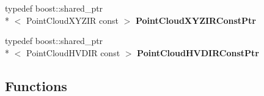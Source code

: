 \begin{DoxyCompactItemize}
\item 
\hypertarget{namespacequanergy_a88b747b6b096c93c7c2043867874a30f}{typedef boost\-::shared\-\_\-ptr\\*
$<$ Point\-Cloud\-X\-Y\-Z\-I\-R const  $>$ {\bfseries Point\-Cloud\-X\-Y\-Z\-I\-R\-Const\-Ptr}}\label{namespacequanergy_a88b747b6b096c93c7c2043867874a30f}

\item 
\hypertarget{namespacequanergy_abb99bfe978e82a194c5efa1e0b1f23e0}{typedef boost\-::shared\-\_\-ptr\\*
$<$ Point\-Cloud\-H\-V\-D\-I\-R const  $>$ {\bfseries Point\-Cloud\-H\-V\-D\-I\-R\-Const\-Ptr}}\label{namespacequanergy_abb99bfe978e82a194c5efa1e0b1f23e0}

\end{DoxyCompactItemize}
\subsection*{Functions}
